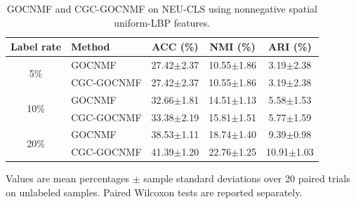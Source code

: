 \begin{table}[t]
\centering
\caption{GOCNMF and CGC-GOCNMF on NEU-CLS using nonnegative spatial uniform-LBP features.}\label{tab:neu_lbp}
\small
\begin{tabular}{clccc}
\toprule
Label rate & Method & ACC (\%) & NMI (\%) & ARI (\%) \\
\midrule
\multirow{2}{*}{5\%} & GOCNMF & 27.42$\pm$2.37 & 10.55$\pm$1.86 & 3.19$\pm$2.38 \\
& CGC-GOCNMF & 27.42$\pm$2.37 & 10.55$\pm$1.86 & 3.19$\pm$2.38 \\
\midrule
\multirow{2}{*}{10\%} & GOCNMF & 32.66$\pm$1.81 & 14.51$\pm$1.13 & 5.58$\pm$1.53 \\
& CGC-GOCNMF & 33.38$\pm$2.19 & 15.81$\pm$1.51 & 5.77$\pm$1.59 \\
\midrule
\multirow{2}{*}{20\%} & GOCNMF & 38.53$\pm$1.11 & 18.74$\pm$1.40 & 9.39$\pm$0.98 \\
& CGC-GOCNMF & 41.39$\pm$1.20 & 22.76$\pm$1.25 & 10.91$\pm$1.03 \\
\bottomrule
\end{tabular}

\vspace{1mm}
\parbox{0.98\linewidth}{\footnotesize
Values are mean percentages $\pm$ sample standard deviations over 20 paired trials on unlabeled samples. Paired Wilcoxon tests are reported separately.}
\end{table}
